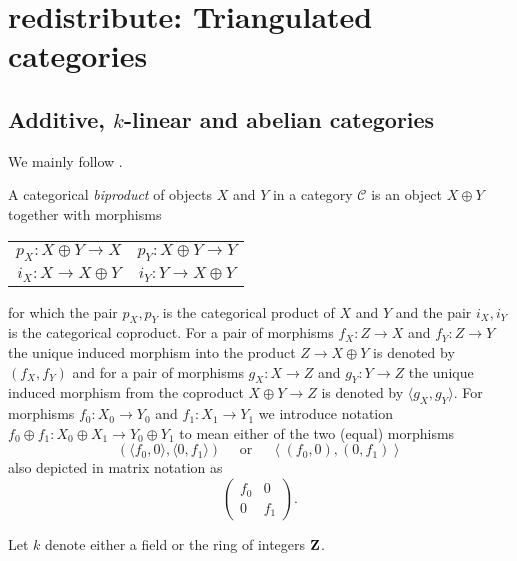 \section{\textsf{redistribute: }Triangulated categories}

\subsection{Additive, $k$-linear and abelian categories}

We mainly follow \cite{kashiwara2006categories}.

A categorical \emph{biproduct} of objects $X$ and $Y$ in a category $\mathcal C$ is an object $X \oplus Y$ together with morphisms
\begin{center}
    \begin{tabular}{c c}
        $p_X\colon X \oplus Y \to X$ & $p_Y\colon X \oplus Y \to Y$ \\
        $i_X\colon X \to X \oplus Y$ & $i_Y\colon Y \to X \oplus Y$ \\
    \end{tabular}
\end{center}
for which the pair $p_X, p_Y$ is the categorical product of $X$ and $Y$ and the pair $i_X, i_Y$ is the categorical coproduct. For a pair of morphisms $f_X \colon Z \to X$ and $f_Y \colon Z \to Y$ the unique induced morphism into the product $Z \to X \oplus Y$ is denoted by $(f_X, f_Y)$ and for a pair of morphisms $g_X \colon X \to Z$ and $g_Y \colon Y \to Z$ the unique induced morphism from the coproduct $X \oplus Y \to Z$ is denoted by $\langle g_X, g_Y \rangle$. For morphisms $f_0 \colon X_0 \to Y_0$ and $f_1 \colon X_1 \to Y_1$ we introduce notation $f_0 \oplus f_1 \colon X_0 \oplus X_1 \to Y_0 \oplus Y_1$ to mean either of the two (equal) morphisms 
\[
    \left(\langle f_0, 0 \rangle, \langle 0, f_1 \rangle\right) 
    \quad \text{ or } \quad 
    \left\langle (f_0, 0), (0, f_1)\right\rangle
\]
also depicted in matrix notation as
\[  
    \begin{pmatrix}
        f_0 & 0 \\
        0 & f_1
    \end{pmatrix}.
\]

Let $k$ denote either a field or the ring of integers $\mathbf Z$.


